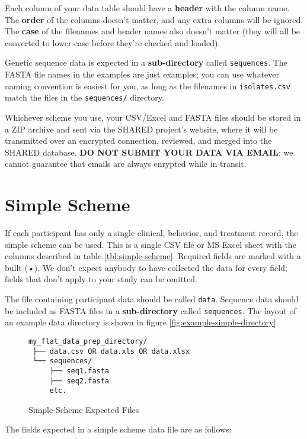 \documentclass{article}
\begin{document}
Each column of your data table should have a \textbf{header} with the
column name. The \textbf{order} of the columns doesn't matter, and any
extra columns will be ignored. The \textbf{case} of the filenames and
header names also doesn't matter (they will all be converted to
lower-case before they're checked and loaded).

Genetic sequence data is expected in a \textbf{sub-directory} called
\texttt{sequences}. The FASTA file names in the examples are just
examples; you can use whatever naming convention is easiest for you,
as long as the filenames in \texttt{isolates.csv} match the files in
the \texttt{sequences/} directory.

Whichever scheme you use, your CSV/Excel and FASTA files should be
stored in a ZIP archive and sent via the SHARED project's website,
where it will be transmitted over an encrypted connection, reviewed,
and merged into the SHARED database. \textbf{DO NOT SUBMIT YOUR DATA
  VIA EMAIL}; we cannot guarantee that emails are always enrypted
while in transit.



\section{Simple Scheme}

If each participant has only a single clinical, behavior, and
treatment record, the simple scheme can be used. This is a single CSV
file or MS Excel sheet with the columns described in table
\ref{tbl:simple-scheme}. Required fields are marked with a bullt (•). We
don't expect anybody to have collected the data for every field;
fields that don't apply to your study can be omitted.

The file containing participant data should be called
\texttt{data}. Sequence data should be included as FASTA files in a
\textbf{sub-directory} called \texttt{sequences}. The layout of an
example data directory is shown in figure
\ref{fig:example-simple-directory}.

\begin{figure}
  \caption{Simple-Scheme Expected Files}
  \label{fig:simple-scheme-expected-files}
\begin{verbatim}
my_flat_data_prep_directory/
 ├── data.csv OR data.xls OR data.xlsx
 └── sequences/
     ├── seq1.fasta
     ├── seq2.fasta
     etc.
\end{verbatim}
\end{figure}

The fields expected in a simple scheme data file are as follows:
\end{document}
